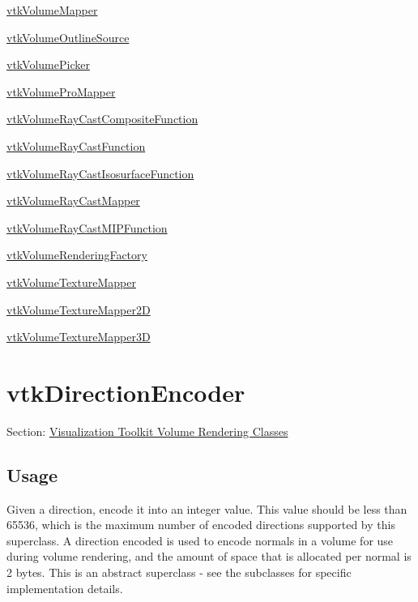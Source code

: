 \begin{DoxyItemize}
\item \hyperlink{vtkvolumerendering_vtkvolumemapper}{vtk\-Volume\-Mapper}  
\item \hyperlink{vtkvolumerendering_vtkvolumeoutlinesource}{vtk\-Volume\-Outline\-Source}  
\item \hyperlink{vtkvolumerendering_vtkvolumepicker}{vtk\-Volume\-Picker}  
\item \hyperlink{vtkvolumerendering_vtkvolumepromapper}{vtk\-Volume\-Pro\-Mapper}  
\item \hyperlink{vtkvolumerendering_vtkvolumeraycastcompositefunction}{vtk\-Volume\-Ray\-Cast\-Composite\-Function}  
\item \hyperlink{vtkvolumerendering_vtkvolumeraycastfunction}{vtk\-Volume\-Ray\-Cast\-Function}  
\item \hyperlink{vtkvolumerendering_vtkvolumeraycastisosurfacefunction}{vtk\-Volume\-Ray\-Cast\-Isosurface\-Function}  
\item \hyperlink{vtkvolumerendering_vtkvolumeraycastmapper}{vtk\-Volume\-Ray\-Cast\-Mapper}  
\item \hyperlink{vtkvolumerendering_vtkvolumeraycastmipfunction}{vtk\-Volume\-Ray\-Cast\-M\-I\-P\-Function}  
\item \hyperlink{vtkvolumerendering_vtkvolumerenderingfactory}{vtk\-Volume\-Rendering\-Factory}  
\item \hyperlink{vtkvolumerendering_vtkvolumetexturemapper}{vtk\-Volume\-Texture\-Mapper}  
\item \hyperlink{vtkvolumerendering_vtkvolumetexturemapper2d}{vtk\-Volume\-Texture\-Mapper2\-D}  
\item \hyperlink{vtkvolumerendering_vtkvolumetexturemapper3d}{vtk\-Volume\-Texture\-Mapper3\-D}  
\end{DoxyItemize}\hypertarget{vtkvolumerendering_vtkdirectionencoder}{}\section{vtk\-Direction\-Encoder}\label{vtkvolumerendering_vtkdirectionencoder}
Section\-: \hyperlink{sec_vtkvolumerendering}{Visualization Toolkit Volume Rendering Classes} \hypertarget{vtkwidgets_vtkxyplotwidget_Usage}{}\subsection{Usage}\label{vtkwidgets_vtkxyplotwidget_Usage}
Given a direction, encode it into an integer value. This value should be less than 65536, which is the maximum number of encoded directions supported by this superclass. A direction encoded is used to encode normals in a volume for use during volume rendering, and the amount of space that is allocated per normal is 2 bytes. This is an abstract superclass -\/ see the subclasses for specific implementation details.

